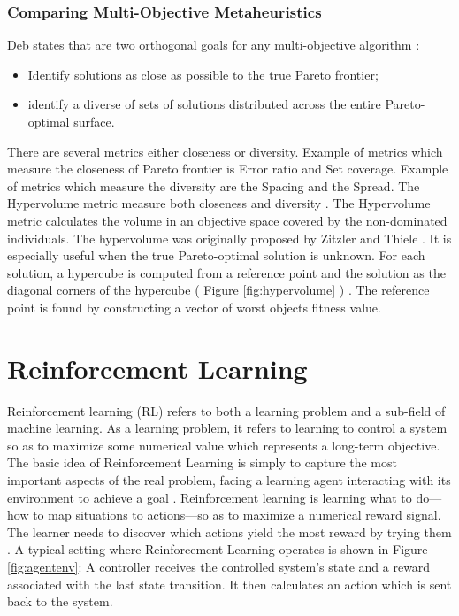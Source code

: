 \documentclass[espaco=umemeio,chapter=TITLE,twoside,openright]{abnt}
\begin{document}
\subsubsection{Comparing Multi-Objective Metaheuristics}

Deb states that are two orthogonal goals for any multi-objective algorithm \cite{deb2001multi}:

\begin{itemize}
\item Identify solutions as close as possible  to the true Pareto frontier;
\item identify a diverse of sets of solutions distributed across the entire Pareto-optimal surface.
\end{itemize}

There are several metrics either closeness or diversity. Example of metrics which measure the closeness of Pareto frontier is Error ratio and Set coverage. Example of metrics which measure the diversity are the Spacing and the Spread. The Hypervolume metric measure both closeness and diversity \cite{janssens2010multiple}. The Hypervolume metric calculates the volume in an objective space covered by the non-dominated individuals. The hypervolume was originally proposed by Zitzler and Thiele \cite{Zitzler1999}. It is especially useful when the true Pareto-optimal solution is unknown. For each solution, a hypercube is computed from a reference point and the solution as the diagonal corners of the hypercube ( Figure \ref{fig:hypervolume} ) \cite{janssens2010multiple}. The reference point is found by constructing a vector of worst objects fitness value.







\section{Reinforcement Learning}

Reinforcement learning (RL) refers to both a learning problem and a sub-field of machine learning. As a learning problem, it refers to learning to control a system so as to maximize some numerical value which represents a long-term objective. The basic idea of Reinforcement Learning is simply to capture the most important aspects of the real problem, facing a learning agent interacting with its environment to achieve a goal \cite{Sutton2012}. Reinforcement learning is learning what to do—how to map situations to actions—so as to maximize a numerical reward signal. The learner needs to discover which actions yield the most reward by trying them \cite{Sutton2012}. A typical setting where Reinforcement Learning operates is shown in Figure \ref{fig:agentenv}: A controller receives the controlled system’s state and a reward associated with the last state transition. It then calculates an action which is sent back to the system.
\end{document}
